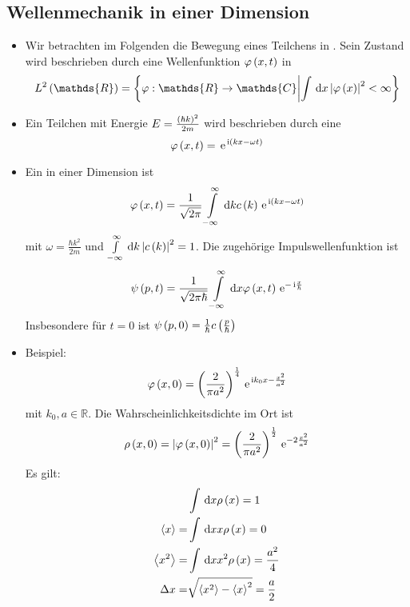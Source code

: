 \subsection{Wellenmechanik in einer Dimension}
\begin{itemize}
  \item Wir betrachten im Folgenden die Bewegung eines Teilchens in . Sein Zustand wird beschrieben durch eine Wellenfunktion $\varphi\left(x,t\right)$ in
  \begin{equation}
    L^2\of{\mathds{R}} = \setProp{\varphi:\mathds{R} \to \mathds{C}}{\int\dd{x}\Norm{\varphi\of{x}}^2< \infty}
  \end{equation}
  \item Ein Teilchen mit Energie $E = \frac{\left( \hbar k \right)^2}{2 m}$ wird beschrieben durch eine 
  \begin{equation}
    \varphi\left(x,t\right) = \, \text{e}^{\, \text{i}\left( kx - \omega t \right)}
  \end{equation}
  \item Ein  in einer Dimension ist
  \begin{equation}
    \varphi\left(x,t\right) = \frac{1}{\sqrt{2\pi}} \int\limits_{-\infty}^{\infty} \,\text d{k} c\left(k\right) \, \text{e}^{\, \text{i}\left( kx-\omega t \right)}
  \end{equation}
  mit $\omega = \frac{\hbar k^2}{2 m}$ und $\int\limits_{-\infty}^{\infty} \,\text d{k} \left\lvert c\left(k\right) \right\rvert^2 = 1$. Die zugehörige Impulswellenfunktion ist
  \begin{equation}
    \psi\left(p,t\right) = \frac{1}{\sqrt{2\pi \hbar}} \int\limits_{-\infty}^{\infty} \,\text d{x} \varphi\left(x,t\right) \, \text{e}^{-\, \text{i}\frac{x}{\hbar}}
  \end{equation}
  Insbesondere für $t = 0$ ist $\psi\left(p,0\right) = \frac{1}{\hbar} c \left(\frac{p}{\hbar}\right)$
  \item Beispiel: 
  \begin{equation}
    \varphi\left(x,0\right) = \left( \frac{2}{\pi a^2} \right)^\frac{1}{4} \, \text{e}^{\, \text{i} k_0 x - \frac{x^2}{a^2}}
  \end{equation}
  mit $k_0,a \in \mathds{R}$. Die  Wahrscheinlichkeitsdichte im Ort ist
  \begin{equation}
    \rho\left(x,0\right) = \left\lvert \varphi\left(x,0\right) \right\rvert^2 = \left( \frac{2}{\pi a^2} \right)^\frac{1}{2} \, \text{e}^{-2\frac{x^2}{a^2}}
  \end{equation}
  Es gilt:
  \begin{align}
    & \int \,\text d{x} \rho\left(x\right) = 1 \\
    \left\langle x \right\rangle = & \int \,\text d{x} x \rho\left(x\right) = 0 \\
    \left\langle x^2 \right\rangle = & \int \,\text d{x} x^2 \rho\left(x\right) = \frac{a^2}{4} \\
    \Delta x = & \sqrt{\left\langle x^2 \right\rangle-\left\langle x \right\rangle^2} = \frac{a}{2}
  \end{align}
\end{itemize}
